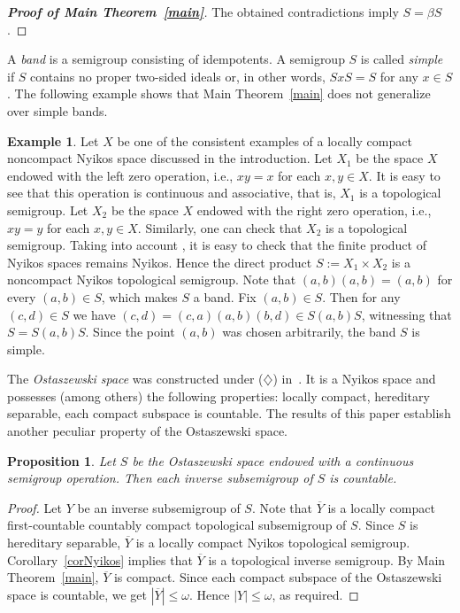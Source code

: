 \documentclass[12pt, twoside, leqno]{article}
\newtheorem{proposition}[theorem]{Proposition}
\theoremstyle{definition}
\newtheorem{example}[theorem]{Example}
\numberwithin{equation}{section}
\newcommand{\w}{\omega}
\begin{document}
\begin{proof}[{\bf Proof of Main Theorem~\ref{main}}]
The obtained contradictions imply $S=\beta S$. 
\end{proof}



A {\em band} is a semigroup consisting of idempotents. A semigroup $S$ is called {\em simple} if $S$ contains no proper two-sided ideals or, in other words, $SxS=S$ for any $x\in S$. 
The following example shows that Main Theorem~\ref{main} does not generalize over simple bands.

\begin{example}
Let $X$ be one of the consistent examples of a locally compact noncompact Nyikos space discussed in the introduction. Let $X_1$ be the space $X$ endowed with the left zero operation, i.e., $xy=x$ for each $x,y\in X$. It is easy to see that this operation is continuous and associative, that is, $X_1$ is a topological semigroup. Let $X_2$ be the space $X$ endowed with the right zero operation, i.e., $xy=y$ for each $x,y\in X$. Similarly, one can check that $X_2$ is a topological semigroup.
Taking into account \cite[Corollary 3.10.15]{Eng}, it is easy to check that the finite product of Nyikos spaces remains Nyikos. Hence the direct product $S:=X_1{\times}X_2$ is a noncompact Nyikos topological semigroup. Note that $(a,b)(a,b)=(a,b)$ for every $(a,b)\in S$, which makes $S$ a band. Fix $(a,b)\in S$. Then for any $(c,d)\in S$ we have $(c,d)=(c,a)(a,b)(b,d)\in S(a,b)S$, witnessing that $S=S(a,b)S$. Since the point $(a,b)$ was chosen arbitrarily, the band $S$ is simple.  
\end{example}

The {\em Ostaszewski space} was constructed under ($\diamondsuit$) in~\cite{Ost}. It is a Nyikos space and possesses (among others) the following properties: locally compact, hereditary separable, each compact subspace is countable. 
The results of this paper establish another peculiar property of the Ostaszewski space.

\begin{proposition}
Let $S$ be the Ostaszewski space endowed with a continuous semigroup operation. Then each inverse subsemigroup of $S$ is countable.    
\end{proposition}

\begin{proof}
Let $Y$ be an inverse subsemigroup of $S$. Note that $\overline{Y}$ is a locally compact first-countable countably compact topological subsemigroup of $S$. Since $S$ is hereditary separable, $\overline{Y}$ is a locally compact Nyikos topological semigroup. Corollary~\ref{corNyikos} implies that $\overline{Y}$ is a topological inverse semigroup. By Main Theorem~\ref{main}, $\overline{Y}$ is compact. Since each compact subspace of the Ostaszewski space is countable, we get $|\overline{Y}|\leq\w$. Hence $|Y|\leq \w$, as required.    
\end{proof}
\end{document}
